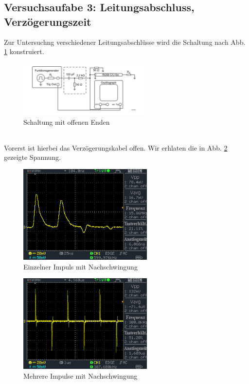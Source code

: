 \documentclass[a4paper,10pt]{article}
\numberwithin{equation}{section}
\begin{document}
\subsection{Versuchsaufabe 3: Leitungsabschluss, Verzögerungszeit}
Zur Untersuchng verschiedener Leitungsabschlüsse wird die Schaltung nach Abb. \ref{fig:3.1} konstruiert. 
\begin{figure}[h]
        \centering
        \includegraphics[width=0.6\textwidth]{Schaltung_Abschluss.png}
        \caption{Schaltung mit offenen Enden}
		\label{fig:3.1}
\end{figure}\\
\indent Vorerst ist hierbei das Verzögerungskabel offen. Wir erhlaten die in Abb. \ref{fig:3.2} gezeigte Spannung.
\begin{figure}[h]
        \centering
        \includegraphics[width=0.6\textwidth]{data/DS0018.BMP.png}
        \caption{Einzelner Impuls mit Nachschwingung}
		\label{fig:3.2}
\end{figure}
\begin{figure}[h]
        \centering
        \includegraphics[width=0.6\textwidth]{data/DS0021.BMP.png}
        \caption{Mehrere Impulse mit Nachschwingung}
		\label{fig:3.3}
\end{figure}\\
\end{document}
